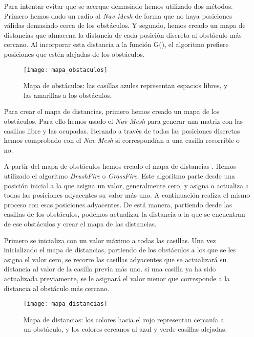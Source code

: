 Para intentar evitar que se acerque demasiado hemos utilizado dos métodos. Primero hemos dado un radio al \textit{Nav Mesh} de forma que no haya posiciones válidas demasiado cerca de los obstáculos. Y segundo, hemos creado un mapa de distancias que almacena la distancia de cada posición discreta al obstáculo más cercano. Al incorporar esta distancia a la función G(), el algoritmo prefiere posiciones que estén alejadas de los obstáculos.

\begin{figure}[htpb]
    \centering
    \texttt{[image: mapa\_obstaculos]}
    \caption[Representación del mapa de obstáculos]{Mapa de obstáculos: las casillas azules representan espacios libres, y las amarillas a los obstáculos.}
    \label{fig:basics AFM sketch}
\end{figure}

Para crear el mapa de distancias, primero hemos creado un mapa de los obstáculos. Para ello hemos usado el \textit{Nav Mesh} para generar una matriz con las casillas libre y las ocupadas. Iterando a través de todas las posiciones discretas hemos comprobado con el \textit{Nav Mesh} si correspondían a una casilla recorrible o no.

A partir del mapa de obstáculos hemos creado el mapa de distancias \label{mapaobstaculos}. Hemos utilizado el algoritmo \textit{BrushFire} o \textit{GrassFire}. Este algoritmo parte desde una posición inicial a la que asigna un valor, generalmente cero, y asigna o actualiza a todas las posiciones adyacentes su valor más uno. A continuación realiza el mismo proceso con esas posiciones adyacentes. De está manera, partiendo desde las casillas de los obstáculos, podemos actualizar la distancia a la que se encuentran de ese obstáculos y crear el mapa de las distancias.

Primero se inicializa con un valor máximo a todas las casillas. Una vez inicializado el mapa de distancias, partiendo de los obstáculos a los que se les asigna el valor cero, se recorre las casillas adyacentes que se actualizará su distancia al valor de la casilla previa más uno. si una casilla ya ha sido actualizada previamente, se le asignará el valor menor que corresponde a la distancia al obstáculo más cercano.

\begin{figure}[htpb]
    \centering
    \texttt{[image: mapa\_distancias]}
    \caption[Representación del mapa de distancias]{Mapa de distancias: los colores hacia el rojo representan cercanía a un obstáculo, y los colores cercanos al azul y verde casillas alejadas.}
    \label{fig:basics AFM sketch}
\end{figure}

